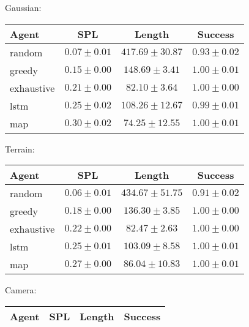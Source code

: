 Gaussian:

\begin{tabular}{lccc}
    \toprule
    Agent & SPL & Length & Success \\
    \midrule
    random & $0.07 \pm 0.01$ & $417.69 \pm 30.87$ & $0.93 \pm 0.02$\\
    greedy & $0.15 \pm 0.00$ & $148.69 \pm 3.41$ & $1.00 \pm 0.01$\\
    exhaustive & $0.21 \pm 0.00$ & $82.10 \pm 3.64$ & $1.00 \pm 0.00$\\
    lstm & $0.25 \pm 0.02$ & $108.26 \pm 12.67$ & $0.99 \pm 0.01$\\
    map & $0.30 \pm 0.02$ & $74.25 \pm 12.55$ & $1.00 \pm 0.01$\\
    \bottomrule
\end{tabular}

Terrain:

\begin{tabular}{lccc}
    \toprule
    Agent & SPL & Length & Success \\
    \midrule
    random & $0.06 \pm 0.01$ & $434.67 \pm 51.75$ & $0.91 \pm 0.02$\\
    greedy & $0.18 \pm 0.00$ & $136.30 \pm 3.85$ & $1.00 \pm 0.00$\\
    exhaustive & $0.22 \pm 0.00$ & $82.47 \pm 2.63$ & $1.00 \pm 0.00$\\
    lstm & $0.25 \pm 0.01$ & $103.09 \pm 8.58$ & $1.00 \pm 0.01$\\
    map & $0.27 \pm 0.00$ & $86.04 \pm 10.83$ & $1.00 \pm 0.01$\\
    \bottomrule
\end{tabular}

Camera:

\begin{tabular}{lccc}
    \toprule
    Agent & SPL & Length & Success \\
    \midrule

    \bottomrule
\end{tabular}